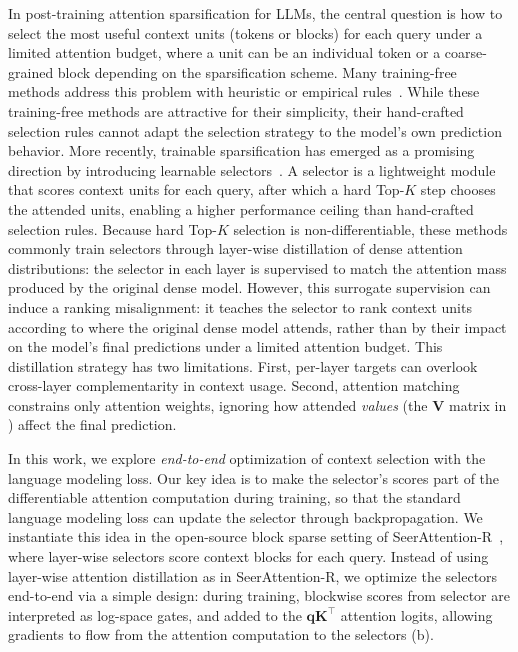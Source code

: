 In post-training attention sparsification for LLMs, the central question is how to select the most useful context units (tokens or blocks) for each query under a limited attention budget, where a unit can be an individual token or a coarse-grained block depending on the sparsification scheme.
Many training-free methods address this problem with heuristic or empirical rules~\citep{xiao2023streamingllm,tang2024quest,xiao2024duoattention,lin2025twilight,jiang2024minference}. 
While these training-free methods are attractive for their simplicity, their hand-crafted selection rules cannot adapt the selection strategy to the model's own prediction behavior.
More recently, trainable sparsification has emerged as a promising direction by introducing learnable selectors~\citep{gao2024seerattention,gao2025seerattention,liu2025deepseek}. A selector is a lightweight module that scores context units for each query, after which a hard Top-$K$ step chooses the attended units, enabling a higher performance ceiling than hand-crafted selection rules.
Because hard Top-$K$ selection is non-differentiable, these methods commonly train selectors through layer-wise distillation of dense attention distributions: the selector in each layer is supervised to match the attention mass produced by the original dense model.
However, this surrogate supervision can induce a ranking misalignment: it teaches the selector to rank context units according to where the original dense model attends, rather than by their impact on the model's final predictions under a limited attention budget.
This distillation strategy has two limitations. First, per-layer targets can overlook cross-layer complementarity in context usage. Second, attention matching constrains only attention weights, ignoring how attended \emph{values} (the $\mathbf{V}$ matrix in ) affect the final prediction.

In this work, we explore \emph{end-to-end} optimization of context selection with the language modeling loss.
Our key idea is to make the selector's scores part of the differentiable attention computation during training, so that the standard language modeling loss can update the selector through backpropagation.
We instantiate this idea in the open-source block sparse setting of SeerAttention-R~\citep{gao2025seerattention}, where layer-wise selectors score context blocks for each query.
Instead of using layer-wise attention distillation as in SeerAttention-R, we optimize the selectors end-to-end via a simple design: during training, blockwise scores from selector are interpreted as log-space gates, and added to the $\mathbf{q}\mathbf{K}^\top$ attention logits, allowing gradients to flow from the attention computation to the selectors (b).

